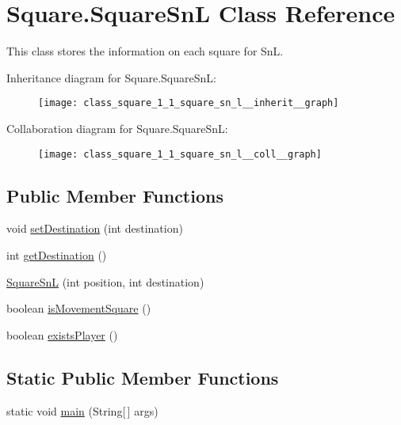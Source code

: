 \hypertarget{class_square_1_1_square_sn_l}{}\section{Square.\+Square\+Sn\+L Class Reference}
\label{class_square_1_1_square_sn_l}


This class stores the information on each square for Sn\+L.  




Inheritance diagram for Square.\+Square\+Sn\+L\+:\nopagebreak
\begin{figure}[H]
\begin{center}
\leavevmode
\texttt{[image: class\_square\_1\_1\_square\_sn\_l\_\_inherit\_\_graph]}
\end{center}
\end{figure}


Collaboration diagram for Square.\+Square\+Sn\+L\+:\nopagebreak
\begin{figure}[H]
\begin{center}
\leavevmode
\texttt{[image: class\_square\_1\_1\_square\_sn\_l\_\_coll\_\_graph]}
\end{center}
\end{figure}
\subsection*{Public Member Functions}
\begin{DoxyCompactItemize}
\item 
void \hyperlink{class_square_1_1_square_sn_l_afc9640a02414948d6ebc719ef8e7ae6f}{set\+Destination} (int destination)
\item 
int \hyperlink{class_square_1_1_square_sn_l_acb377b2ceb8dd5b8d65bba391f4c256d}{get\+Destination} ()
\item 
\hyperlink{class_square_1_1_square_sn_l_ac89482de8a579e2b2249f9d8bf652351}{Square\+Sn\+L} (int position, int destination)
\item 
boolean \hyperlink{class_square_1_1_square_sn_l_ad948a877cff45a872082f23d72924770}{is\+Movement\+Square} ()
\item 
boolean \hyperlink{class_square_1_1_square_sn_l_a7f23505690a2a6ccfe9126448f66ddeb}{exists\+Player} ()
\end{DoxyCompactItemize}
\subsection*{Static Public Member Functions}
\begin{DoxyCompactItemize}
\item 
static void \hyperlink{class_square_1_1_square_sn_l_ac30c492a8a5c6f0f9bf43faa069dfa5c}{main} (String\mbox{[}$\,$\mbox{]} args)
\end{DoxyCompactItemize}
